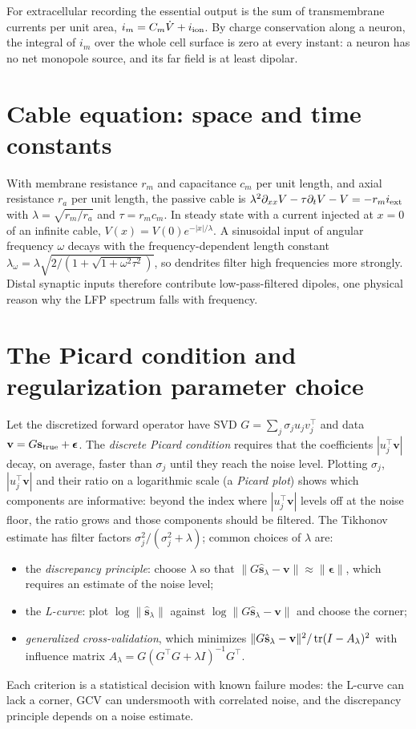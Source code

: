 For extracellular recording the essential output is the sum of
transmembrane currents per unit area,
$i_m=C_m\dot V+i_{\rm ion}$. By charge conservation along a neuron, the
integral of $i_m$ over the whole cell surface is zero at every instant:
a neuron has no net monopole source, and its far field is at least
dipolar.

\section{Cable equation: space and time constants}
With membrane resistance $r_m$ and capacitance $c_m$ per unit length,
and axial resistance $r_a$ per unit length, the passive cable is
$\lambda^2\partial_{xx}V-\tau\partial_tV-V=-r_mi_{\rm ext}$ with
$\lambda=\sqrt{r_m/r_a}$ and $\tau=r_mc_m$. In steady state with a
current injected at $x=0$ of an infinite cable,
$V(x)=V(0)e^{-|x|/\lambda}$. A sinusoidal input of angular frequency
$\omega$ decays with the frequency-dependent length constant
$\lambda_\omega=\lambda\sqrt{2/(1+\sqrt{1+\omega^2\tau^2})}$, so dendrites
filter high frequencies more strongly. Distal synaptic inputs therefore
contribute low-pass-filtered dipoles, one physical reason why the LFP
spectrum falls with frequency.

\section{The Picard condition and regularization parameter choice}
Let the discretized forward operator have SVD $G=\sum_j\sigma_ju_jv_j^\top$
and data $\mathbf v=G\mathbf s_{\rm true}+\boldsymbol\epsilon$. The
\emph{discrete Picard condition} requires that the coefficients
$|u_j^\top\mathbf v|$ decay, on average, faster than $\sigma_j$ until they
reach the noise level. Plotting $\sigma_j$, $|u_j^\top\mathbf v|$ and
their ratio on a logarithmic scale (a \emph{Picard plot}) shows which
components are informative: beyond the index where
$|u_j^\top\mathbf v|$ levels off at the noise floor, the ratio grows
and those components should be filtered. The Tikhonov estimate has
filter factors $\sigma_j^2/(\sigma_j^2+\lambda)$; common choices of
$\lambda$ are:
\begin{itemize}[leftmargin=2em]
\item the \emph{discrepancy principle}: choose $\lambda$ so that
$\|G\hat{\mathbf s}_\lambda-\mathbf v\|\approx\|\boldsymbol\epsilon\|$,
which requires an estimate of the noise level;
\item the \emph{L-curve}: plot $\log\|\hat{\mathbf s}_\lambda\|$ against
$\log\|G\hat{\mathbf s}_\lambda-\mathbf v\|$ and choose the corner;
\item \emph{generalized cross-validation}, which minimizes
$\|G\hat{\mathbf s}_\lambda-\mathbf v\|^2/\operatorname{tr}(I-A_\lambda)^2$ with
influence matrix $A_\lambda=G(G^\top G+\lambda I)^{-1}G^\top$.
\end{itemize}
Each criterion is a statistical decision with known failure modes: the
L-curve can lack a corner, GCV can undersmooth with correlated noise,
and the discrepancy principle depends on a noise estimate.

